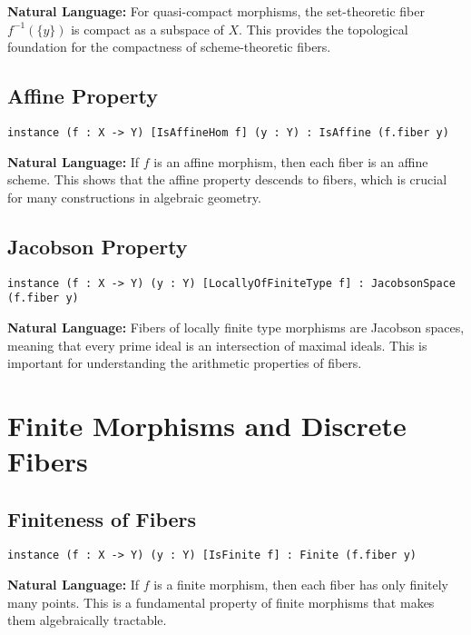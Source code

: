 \documentclass{article}
\theoremstyle{definition}
\begin{document}
\textbf{Natural Language:} For quasi-compact morphisms, the set-theoretic fiber $f^{-1}(\{y\})$ is compact as a subspace of $X$. This provides the topological foundation for the compactness of scheme-theoretic fibers.

\subsection{Affine Property}

\begin{lstlisting}
instance (f : X -> Y) [IsAffineHom f] (y : Y) : IsAffine (f.fiber y)
\end{lstlisting}

\textbf{Natural Language:} If $f$ is an affine morphism, then each fiber is an affine scheme. This shows that the affine property descends to fibers, which is crucial for many constructions in algebraic geometry.

\subsection{Jacobson Property}

\begin{lstlisting}
instance (f : X -> Y) (y : Y) [LocallyOfFiniteType f] : JacobsonSpace (f.fiber y)
\end{lstlisting}

\textbf{Natural Language:} Fibers of locally finite type morphisms are Jacobson spaces, meaning that every prime ideal is an intersection of maximal ideals. This is important for understanding the arithmetic properties of fibers.

\section{Finite Morphisms and Discrete Fibers}

\subsection{Finiteness of Fibers}

\begin{lstlisting}
instance (f : X -> Y) (y : Y) [IsFinite f] : Finite (f.fiber y)
\end{lstlisting}

\textbf{Natural Language:} If $f$ is a finite morphism, then each fiber has only finitely many points. This is a fundamental property of finite morphisms that makes them algebraically tractable.
\end{document}
